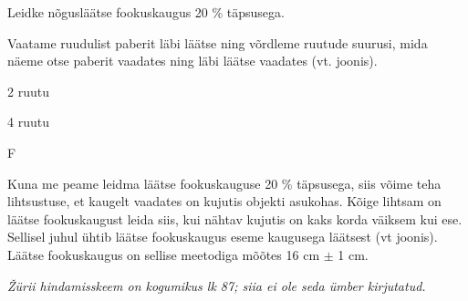 
Leidke nõgusläätse fookuskaugus 20 \% täpsusega.

\hint

\solu
Vaatame ruudulist paberit läbi läätse ning võrdleme ruutude suurusi, mida näeme otse paberit vaadates ning läbi läätse vaadates (vt. joonis).

2 ruutu

4 ruutu

F

Kuna me peame leidma läätse fookuskauguse 20 \% täpsusega, siis võime teha lihtsustuse, et kaugelt vaadates on kujutis objekti asukohas. Kõige lihtsam on läätse fookuskaugust leida siis, kui nähtav kujutis on kaks korda väiksem kui ese. Sellisel juhul ühtib läätse fookuskaugus eseme kaugusega läätsest (vt joonis). Läätse fookuskaugus on sellise meetodiga mõõtes 16 cm $\pm$ 1 cm.

\textit{Žürii hindamisskeem on kogumikus lk 87; siia ei ole seda ümber kirjutatud.}
\probend
